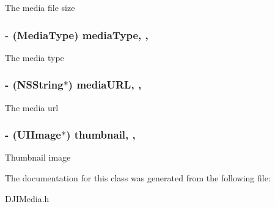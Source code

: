 The media file size \hypertarget{interface_d_j_i_media_a72e5f802cc23493a1105001685c592dd}{
\subsubsection[{media\+Type}]{\setlength{\rightskip}{0pt plus 5cm}-\/ (Media\+Type) media\+Type\hspace{0.3cm}{\ttfamily [read]}, {\ttfamily [nonatomic]}, {\ttfamily [assign]}}}\label{interface_d_j_i_media_a72e5f802cc23493a1105001685c592dd}
The media type \hypertarget{interface_d_j_i_media_ab7c862faf6304e43f5f1ce49762e1b0d}{
\subsubsection[{media\+U\+R\+L}]{\setlength{\rightskip}{0pt plus 5cm}-\/ (N\+S\+String$\ast$) media\+U\+R\+L\hspace{0.3cm}{\ttfamily [read]}, {\ttfamily [nonatomic]}, {\ttfamily [assign]}}}\label{interface_d_j_i_media_ab7c862faf6304e43f5f1ce49762e1b0d}
The media url \hypertarget{interface_d_j_i_media_ab3f581d4ba9f69844becf18ebfeb6d2c}{
\subsubsection[{thumbnail}]{\setlength{\rightskip}{0pt plus 5cm}-\/ (U\+I\+Image$\ast$) thumbnail\hspace{0.3cm}{\ttfamily [read]}, {\ttfamily [nonatomic]}, {\ttfamily [assign]}}}\label{interface_d_j_i_media_ab3f581d4ba9f69844becf18ebfeb6d2c}
Thumbnail image 

The documentation for this class was generated from the following file\+:\begin{DoxyCompactItemize}
\item 
D\+J\+I\+Media.\+h\end{DoxyCompactItemize}
